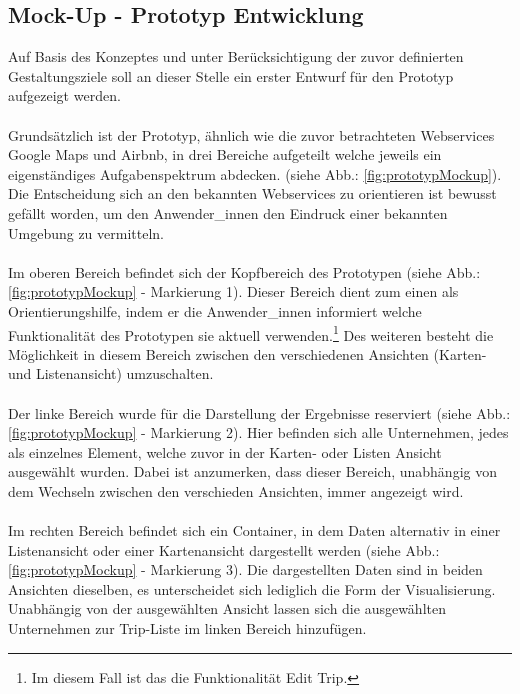 \documentclass[Bachelorarbeit.tex]{subfiles}
\begin{document}
\subsection{Mock-Up - Prototyp Entwicklung}
\label{chap:entwicklung:sec:design_entwurf:sub:mockUps}
Auf Basis des Konzeptes und unter Berücksichtigung der zuvor definierten Gestaltungsziele soll an dieser Stelle ein erster Entwurf für den Prototyp aufgezeigt werden.\\
\\
Grundsätzlich ist der Prototyp, ähnlich wie die zuvor betrachteten Webservices Google Maps und Airbnb, in drei Bereiche aufgeteilt welche jeweils ein eigenständiges Aufgabenspektrum abdecken. (siehe Abb.: \ref{fig:prototypMockup}). 
Die Entscheidung sich an den bekannten Webservices zu orientieren ist bewusst gefällt worden, um den Anwender\_innen den Eindruck einer bekannten Umgebung zu vermitteln.\\
\\
Im oberen Bereich befindet sich der Kopfbereich des Prototypen (siehe Abb.: \ref{fig:prototypMockup} - Markierung 1). 
Dieser Bereich dient zum einen als Orientierungshilfe, indem er die Anwender\_innen informiert welche Funktionalität des Prototypen sie aktuell verwenden.\footnote{Im diesem Fall ist das die Funktionalität Edit Trip.}
Des weiteren besteht die Möglichkeit in diesem Bereich zwischen den verschiedenen Ansichten (Karten- und Listenansicht) umzuschalten.\\
\\
Der linke Bereich wurde für die Darstellung der Ergebnisse reserviert (siehe Abb.: \ref{fig:prototypMockup} - Markierung 2). 
Hier befinden sich alle Unternehmen, jedes als einzelnes Element, welche zuvor in der Karten- oder Listen Ansicht ausgewählt wurden.
Dabei ist anzumerken, dass dieser Bereich, unabhängig von dem Wechseln zwischen den verschieden Ansichten, immer angezeigt wird. \\
\\
Im rechten Bereich befindet sich ein Container, in dem Daten alternativ in einer Listenansicht oder einer Kartenansicht dargestellt werden (siehe Abb.: \ref{fig:prototypMockup} - Markierung 3). 
Die dargestellten Daten sind in beiden Ansichten dieselben, es unterscheidet sich lediglich die Form der Visualisierung.
Unabhängig von der ausgewählten Ansicht lassen sich die ausgewählten Unternehmen zur Trip-Liste im linken Bereich hinzufügen.
\end{document}

